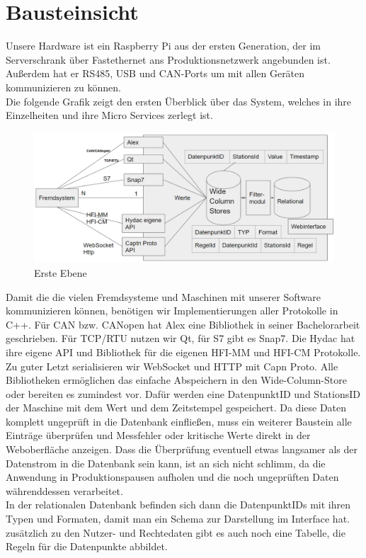 \section{Bausteinsicht}
Unsere Hardware ist ein Raspberry Pi aus der ersten Generation, der im Serverschrank über Fastethernet ans Produktionsnetzwerk angebunden ist. Außerdem hat er RS485, USB und CAN-Ports um mit allen Geräten kommunizieren zu können.\\
Die folgende Grafik zeigt den ersten Überblick über das System, welches in ihre Einzelheiten und ihre Micro Services zerlegt ist.
\begin{figure}[h]
	\centering
	\includegraphics[width=1.0\textwidth]{Graphics/blackbox1.png}
	\caption{Erste Ebene}
	\label{fig:erste_ebene}
\end{figure}
Damit die die vielen Fremdsysteme und Maschinen mit unserer Software kommunizieren können, benötigen wir Implementierungen aller Protokolle in C++. Für CAN bzw. CANopen hat Alex eine Bibliothek in seiner Bachelorarbeit geschrieben. Für TCP/RTU nutzen wir Qt, für S7 gibt es Snap7. Die Hydac hat ihre eigene API und Bibliothek für die eigenen HFI-MM und HFI-CM Protokolle. Zu guter Letzt serialisieren wir WebSocket und HTTP mit Capn Proto. Alle Bibliotheken ermöglichen das einfache Abspeichern in den Wide-Column-Store oder bereiten es zumindest vor. Dafür werden eine DatenpunktID und StationsID der Maschine mit dem Wert und dem Zeitstempel gespeichert. Da diese Daten komplett ungeprüft in die Datenbank einfließen, muss ein weiterer Baustein alle Einträge überprüfen und Messfehler oder kritische Werte direkt in der Weboberfläche anzeigen. Dass die Überprüfung eventuell etwas langsamer als der Datenstrom in die Datenbank sein kann, ist an sich nicht schlimm, da die Anwendung in Produktionspausen aufholen und die noch ungeprüften Daten währenddessen verarbeitet.\\
In der relationalen Datenbank befinden sich dann die DatenpunktIDs mit ihren Typen und Formaten, damit man ein Schema zur Darstellung im Interface hat. zusätzlich zu den Nutzer- und Rechtedaten gibt es auch noch eine Tabelle, die Regeln für die Datenpunkte abbildet.\\
